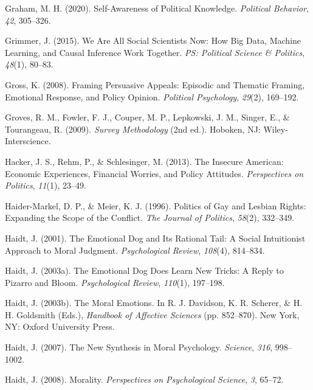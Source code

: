 \documentclass[12pt,econ]{sources/authesis}
\begin{document}
\leavevmode\hypertarget{ref-graham_2020_self-awareness}{}%
Graham, M. H. (2020). Self-Awareness of Political Knowledge. \emph{Political Behavior}, \emph{42}, 305--326.

\leavevmode\hypertarget{ref-grimmer_2015_social}{}%
Grimmer, J. (2015). We Are All Social Scientists Now: How Big Data, Machine Learning, and Causal Inference Work Together. \emph{PS: Political Science \& Politics}, \emph{48}(1), 80--83.

\leavevmode\hypertarget{ref-gross_framing_2008}{}%
Gross, K. (2008). Framing Persuasive Appeals: Episodic and Thematic Framing, Emotional Response, and Policy Opinion. \emph{Political Psychology}, \emph{29}(2), 169--192.

\leavevmode\hypertarget{ref-groves_survey_2009}{}%
Groves, R. M., Fowler, F. J., Couper, M. P., Lepkowski, J. M., Singer, E., \& Tourangeau, R. (2009). \emph{Survey Methodology} (2nd ed.). Hoboken, NJ: Wiley-Interscience.

\leavevmode\hypertarget{ref-hacker_insecure_2013}{}%
Hacker, J. S., Rehm, P., \& Schlesinger, M. (2013). The Insecure American: Economic Experiences, Financial Worries, and Policy Attitudes. \emph{Perspectives on Politics}, \emph{11}(1), 23--49.

\leavevmode\hypertarget{ref-haider-markel_1996_politics}{}%
Haider-Markel, D. P., \& Meier, K. J. (1996). Politics of Gay and Lesbian Rights: Expanding the Scope of the Conflict. \emph{The Journal of Politics}, \emph{58}(2), 332--349.

\leavevmode\hypertarget{ref-haidt_2001_emotional}{}%
Haidt, J. (2001). The Emotional Dog and Its Rational Tail: A Social Intuitionist Approach to Moral Judgment. \emph{Psychological Review}, \emph{108}(4), 814--834.

\leavevmode\hypertarget{ref-haidt_2003_emotional}{}%
Haidt, J. (2003a). The Emotional Dog Does Learn New Tricks: A Reply to Pizarro and Bloom. \emph{Psychological Review}, \emph{110}(1), 197--198.

\leavevmode\hypertarget{ref-haidt_moral_2003}{}%
Haidt, J. (2003b). The Moral Emotions. In R. J. Davidson, K. R. Scherer, \& H. H. Goldsmith (Eds.), \emph{Handbook of Affective Sciences} (pp. 852--870). New York, NY: Oxford University Press.

\leavevmode\hypertarget{ref-haidt_2007_synthesis}{}%
Haidt, J. (2007). The New Synthesis in Moral Psychology. \emph{Science}, \emph{316}, 998--1002.

\leavevmode\hypertarget{ref-haidt_2008_morality}{}%
Haidt, J. (2008). Morality. \emph{Perspectives on Psychological Science}, \emph{3}, 65--72.
\end{document}
